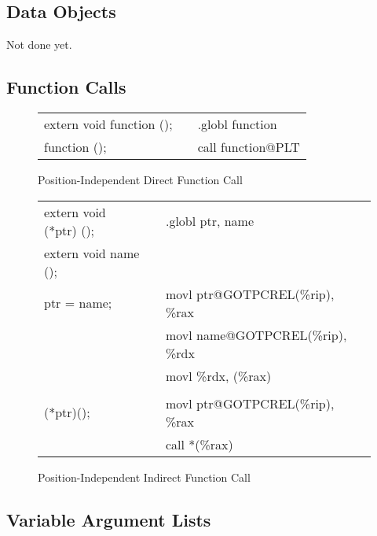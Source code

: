 \subsection{Data Objects}

Not done yet.

\subsection{Function Calls}

\begin{figure}[H]
\Hrule
\caption{Position-Independent Direct Function Call}
\begin{center}
\begin{tabular}{|l|c|l|}
\cline{1-1}\cline{3-3}
extern void function ();  &&.globl function\\
function ();              &&call function@PLT\\
\cline{1-1}\cline{3-3}
\end{tabular}
\end{center}
\Hrule
\end{figure}

\begin{figure}[H]
\Hrule
\caption{Position-Independent Indirect Function Call}
\begin{center}
\begin{tabular}{|l|c|l|}
\cline{1-1}\cline{3-3}
extern void (*ptr) ();    &&.globl ptr, name\\
extern void name ();      && \\
ptr = name;               &&movl ptr@GOTPCREL(\%rip), \%rax  \\
                          &&movl name@GOTPCREL(\%rip), \%rdx  \\
                          &&movl \%rdx, (\%rax)  \\
                          &&  \\
(*ptr)();                 &&movl ptr@GOTPCREL(\%rip), \%rax  \\
                          &&call *(\%rax)  \\
\cline{1-1}\cline{3-3}
\end{tabular}
\end{center}
\Hrule
\end{figure}

\subsection{Variable Argument Lists}


